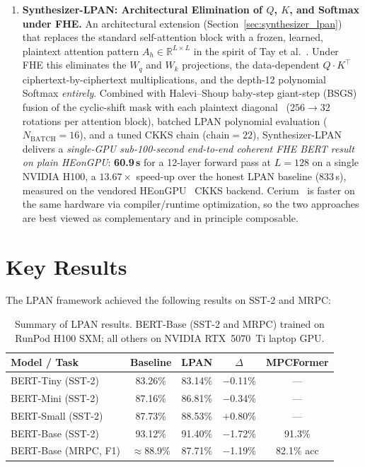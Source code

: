 \begin{enumerate}
    \item \textbf{Synthesizer-LPAN: Architectural Elimination of $Q$, $K$, and Softmax under FHE.} An architectural extension (Section~\ref{sec:synthesizer_lpan}) that replaces the standard self-attention block with a frozen, learned, plaintext attention pattern $A_h \in \mathbb{R}^{L\times L}$ in the spirit of Tay et al.~\cite{tay2020synthesizer}. Under FHE this eliminates the $W_q$ and $W_k$ projections, the data-dependent $Q\!\cdot\!K^\top$ ciphertext-by-ciphertext multiplications, and the depth-12 polynomial Softmax \emph{entirely}. Combined with Halevi--Shoup baby-step giant-step (BSGS) fusion of the cyclic-shift mask with each plaintext diagonal~\cite{halevi2014bsgs} ($256 \to 32$ rotations per attention block), batched LPAN polynomial evaluation ($N_{\mathrm{BATCH}} = 16$), and a tuned CKKS chain ($\mathrm{chain} = 22$), Synthesizer-LPAN delivers a \emph{single-GPU sub-100-second end-to-end coherent FHE BERT result on plain HEonGPU}: \textbf{60.9\,s} for a 12-layer forward pass at $L = 128$ on a single NVIDIA H100, a $\mathbf{13.67\times}$ speed-up over the honest LPAN baseline ($833$\,s), measured on the vendored HEonGPU~\cite{kim2024heongpu} CKKS backend. Cerium~\cite{cerium2025} is faster on the same hardware via compiler/runtime optimization, so the two approaches are best viewed as complementary and in principle composable.
\end{enumerate}

\section{Key Results}

The LPAN framework achieved the following results on SST-2 and MRPC:

\begin{table}[ht]
\centering
\caption{Summary of LPAN results. BERT-Base (SST-2 and MRPC) trained on RunPod H100 SXM; all others on NVIDIA RTX~5070~Ti laptop GPU.}
\label{tab:conclusion_results}
\begin{tabular}{lcccc}
\toprule
\textbf{Model / Task} & \textbf{Baseline} & \textbf{LPAN} & \textbf{$\Delta$} & \textbf{MPCFormer} \\
\midrule
BERT-Tiny (SST-2)      & 83.26\% & 83.14\%               & $-$0.11\% & --- \\
BERT-Mini (SST-2)      & 87.16\% & 86.81\%               & $-$0.34\% & --- \\
BERT-Small (SST-2)     & 87.73\% & 88.53\%               & $+$0.80\% & --- \\
BERT-Base (SST-2)      & 93.12\% & 91.40\%               & $-$1.72\% & 91.3\% \\
BERT-Base (MRPC, F1)   & $\approx$88.9\% & 87.71\%  & $-$1.19\% & 82.1\% acc \\
\bottomrule
\end{tabular}
\end{table}

